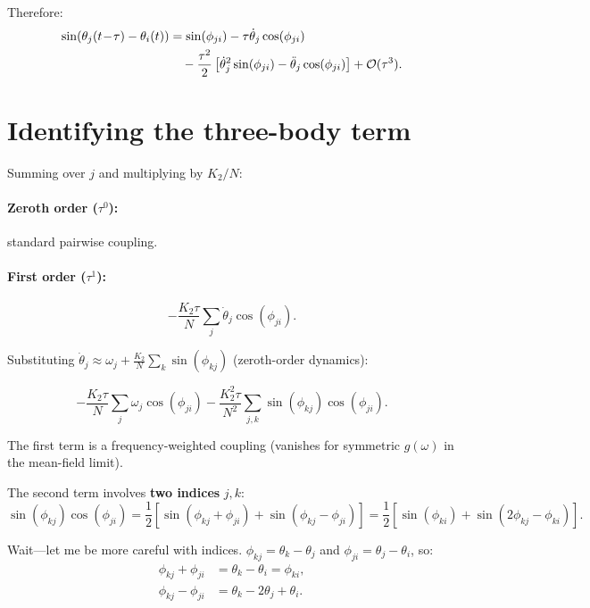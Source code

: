 \documentclass[11pt]{article}
\newcommand{\Order}{\mathcal{O}}
\begin{document}
Therefore:
\begin{align}
  \sin(\theta_j(t\!-\!\tau) - \theta_i(t))
  &= \sin(\phi_{ji})
  - \tau\dot{\theta}_j\cos(\phi_{ji}) \notag\\
  &\quad - \frac{\tau^2}{2}\left[\dot{\theta}_j^2\sin(\phi_{ji})
    - \ddot{\theta}_j\cos(\phi_{ji})\right] + \Order(\tau^3).
  \label{eq:full-expand}
\end{align}

\section{Identifying the three-body term}

Summing over $j$ and multiplying by $K_2/N$:

\paragraph{Zeroth order ($\tau^0$):} standard pairwise coupling.

\paragraph{First order ($\tau^1$):}
\begin{equation}
  -\frac{K_2\tau}{N}\sum_j \dot{\theta}_j\cos(\phi_{ji}).
  \label{eq:first-order}
\end{equation}

Substituting $\dot{\theta}_j \approx \omega_j + \frac{K_2}{N}\sum_k
\sin(\phi_{kj})$ (zeroth-order dynamics):

\begin{equation}
  -\frac{K_2\tau}{N}\sum_j \omega_j\cos(\phi_{ji})
  - \frac{K_2^2\tau}{N^2}\sum_{j,k}\sin(\phi_{kj})\cos(\phi_{ji}).
  \label{eq:first-order-expanded}
\end{equation}

The first term is a frequency-weighted coupling (vanishes for symmetric
$g(\omega)$ in the mean-field limit).

The second term involves \textbf{two indices} $j,k$:
\begin{equation}
  \sin(\phi_{kj})\cos(\phi_{ji})
  = \frac{1}{2}\left[\sin(\phi_{kj}+\phi_{ji}) + \sin(\phi_{kj}-\phi_{ji})\right]
  = \frac{1}{2}\left[\sin(\phi_{ki}) + \sin(2\phi_{kj}-\phi_{ki})\right].
\end{equation}

Wait---let me be more careful with indices.  $\phi_{kj} = \theta_k-\theta_j$
and $\phi_{ji} = \theta_j-\theta_i$, so:
\begin{align}
  \phi_{kj} + \phi_{ji} &= \theta_k - \theta_i = \phi_{ki}, \\
  \phi_{kj} - \phi_{ji} &= \theta_k - 2\theta_j + \theta_i.
\end{align}
\end{document}
